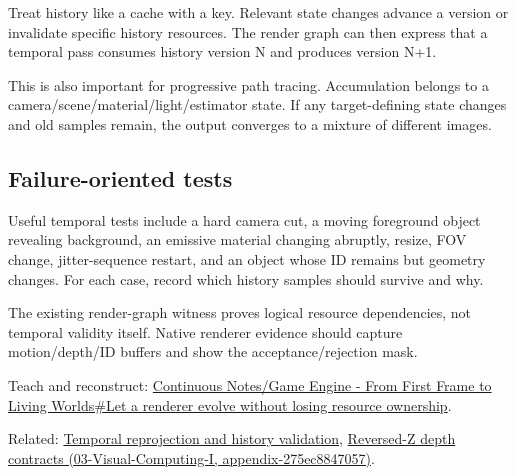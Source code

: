 Treat history like a cache with a key. Relevant state changes advance a version or invalidate specific history resources. The render graph can then express that a temporal pass consumes history version N and produces version N+1.

This is also important for progressive path tracing. Accumulation belongs to a camera/scene/material/light/estimator state. If any target-defining state changes and old samples remain, the output converges to a mixture of different images.

\subsection{Failure-oriented tests}\label{failure-oriented-tests}

Useful temporal tests include a hard camera cut, a moving foreground object revealing background, an emissive material changing abruptly, resize, FOV change, jitter-sequence restart, and an object whose ID remains but geometry changes. For each case, record which history samples should survive and why.

The existing render-graph witness proves logical resource dependencies, not temporal validity itself. Native renderer evidence should capture motion/depth/ID buffers and show the acceptance/rejection mask.

Teach and reconstruct: \href{Continuous\%20Notes/Game\%20Engine\%20-\%20From\%20First\%20Frame\%20to\%20Living\%20Worlds\#Let\%20a\%20renderer\%20evolve\%20without\%20losing\%20resource\%20ownership}{Continuous Notes/Game Engine - From First Frame to Living Worlds\#Let a renderer evolve without losing resource ownership}.

Related: \hyperref[appendix-0727340a4428]{Temporal reprojection and history validation}, \href{}{Reversed-Z depth contracts (03-Visual-Computing-I, appendix-275ec8847057)}.
